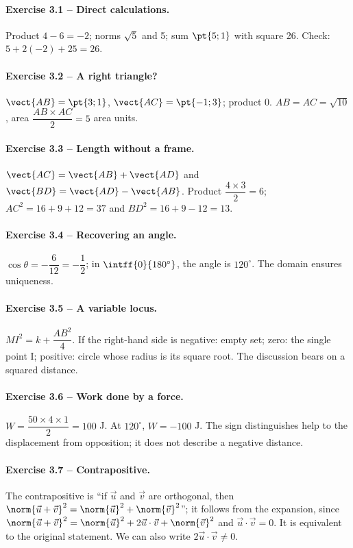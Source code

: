 \paragraph{Exercise 3.1 -- Direct calculations.} Product $4-6=-2$; norms $\sqrt5$ and 5; sum $\pt{5;1}$ with square 26. Check: $5+2(-2)+25=26$.
\paragraph{Exercise 3.2 -- A right triangle?} $\vect{AB}=\pt{3;1}$, $\vect{AC}=\pt{-1;3}$; product 0. $AB=AC=\sqrt{10}$, area $\dfrac{AB\times AC}{2}=5$ area units.
\paragraph{Exercise 3.3 -- Length without a frame.} $\vect{AC}=\vect{AB}+\vect{AD}$ and $\vect{BD}=\vect{AD}-\vect{AB}$. Product $\dfrac{4\times 3}{2}=6$; $AC^2=16+9+12=37$ and $BD^2=16+9-12=13$.
\paragraph{Exercise 3.4 -- Recovering an angle.} $\cos \theta =-\dfrac{6}{12}=-\dfrac{1}{2}$; in $\intff{0}{180^\circ}$, the angle is $120^\circ$. The domain ensures uniqueness.
\paragraph{Exercise 3.5 -- A variable locus.} $MI^2=k+\dfrac{AB^2}{4}$. If the right-hand side is negative: empty set; zero: the single point I; positive: circle whose radius is its square root. The discussion bears on a squared distance.
\paragraph{Exercise 3.6 -- Work done by a force.} $W=\dfrac{50\times 4\times 1}{2}=100$ J. At $120^\circ$, $W=-100$ J. The sign distinguishes help to the displacement from opposition; it does not describe a negative distance.
\paragraph{Exercise 3.7 -- Contrapositive.} The contrapositive is ``if $\vec u$ and $\vec v$ are orthogonal, then $\norm{\vec u+\vec v}^2=\norm{\vec u}^2+\norm{\vec v}^2$''; it follows from the expansion, since $\norm{\vec u+\vec v}^2=\norm{\vec u}^2+2\vec u\cdot\vec v+\norm{\vec v}^2$ and $\vec u\cdot\vec v=0$. It is equivalent to the original statement. We can also write $2\vec u\cdot\vec v\ne0$.
